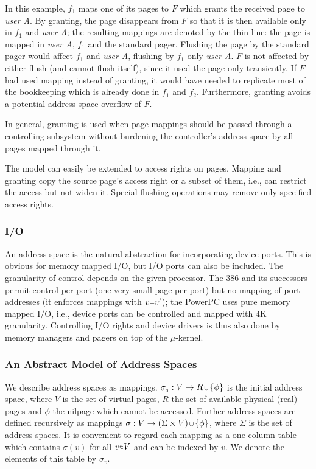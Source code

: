 \documentclass[a4paper,11pt,twoside,dvips]{book}
\newcommand{\micro}{$\mu$}
\newcommand{\smaller}[1]{{\mathchoice 
           {\raisebox{1pt}{$\scriptstyle #1$}} 
           {\raisebox{1pt}{$\scriptstyle #1$}} 
           {\raisebox{0.5pt}{$\scriptscriptstyle #1$}} 
           {\raisebox{0.5pt}{$\scriptscriptstyle #1$}} 
}}
\newcommand{\smallerlow}[1]{{\mathchoice 
           {\mbox{$\scriptstyle \,#1\,$}} 
           {\mbox{$\scriptstyle \,#1\,$}} 
           {\mbox{$\scriptscriptstyle \,#1\,$}} 
           {\mbox{$\scriptscriptstyle \,#1\,$}} 
}}
\newcommand{\IN}{\smaller{\in}}
\newcommand{\EQ}{\smaller{=}}
\newcommand{\CUP}{\smallerlow{\cup}}
\begin{document}
% 
In this example, $f_1$ maps one of its pages to $F$ which grants the
received page to {\em user A}. By granting, the page disappears from $F$ so
that it is then available only in $f_1$ and
{\em user A}; the resulting mappings are denoted by the thin line: the page
is mapped in {\em user A}, $f_1$ and the standard pager. Flushing the page by
the standard pager would affect $f_1$ and {\em user A}, flushing by $f_1$
only {\em
user A}. $F$ is not affected by either flush (and cannot flush itself),
since it used the page only transiently.
If $F$ had used mapping instead of granting, it would have needed to
replicate most of the bookkeeping which is already done in $f_1$ and
$f_2$. Furthermore, granting avoids a potential address-space overflow of
$F$.
 
In general, granting is used when
page mappings should be passed through a controlling subsystem without
burdening the controller's address space by all pages mapped through it.

 
 
The model can easily be extended to access rights on pages. Mapping and
granting copy the source page's access right or a subset of them, i.e., can
restrict the access but not widen it. Special flushing operations may remove
only specified access rights. 
 
 
 
\subsubsection*{I/O} 
 
An address space is the natural abstraction for incorporating device
ports. This is obvious for memory mapped I/O, but I/O ports can also be
included. The granularity of control depends on the given processor.
The 386 and its successors permit control per port (one very small page
per port) but no mapping of port addresses (it enforces mappings with $v\EQ
v'$); the PowerPC uses pure memory mapped I/O, i.e., device ports can be
controlled and mapped with 4K granularity. 
Controlling I/O rights and device drivers is thus also done by memory
managers and pagers on top of the \micro-kernel. 
 
 
 
 
\subsubsection*{An Abstract Model of Address Spaces} 
 
We describe address spaces as mappings.
$\sigma_{_0}: V \rightarrow R \CUP \{\phi\}$ is the initial
address space, where $V$ is the set of virtual pages, $R$ the set of
available physical (real) pages and $\phi$ the nilpage which cannot be
accessed.
Further address spaces are defined recursively as mappings
$\sigma: V \rightarrow (\Sigma \times V)\CUP\{\phi\}$, where
$\Sigma$ is the set of address spaces. It is convenient to regard each
mapping as a one column table which contains $\sigma(v)$ for all $v\IN V$
and can be indexed by $v$. We denote the elements of this table by
$\sigma_v$. 
 
\end{document}

